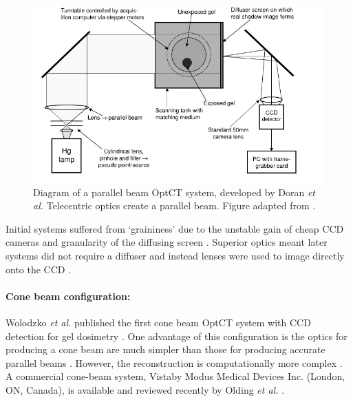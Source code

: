 \documentclass[12pt]{article}
\begin{document}
\begin{figure}[H]
\centering
\includegraphics[scale=0.55]{Doran_2001_ccdsetup.jpg}
\caption{Diagram of a parallel beam  OptCT system, developed by Doran \textit{et al.} Telecentric optics create a parallel beam.  Figure adapted from \cite{Doran:2001ee}. }
\label{fig:doran_ccd_setup}
\end{figure}



Initial systems  suffered from `graininess' due to the unstable gain of cheap CCD cameras and granularity of the diffusing screen \cite{Doran:2001ee}. Superior optics meant later systems did not require a diffuser and instead lenses were used to image directly onto the CCD \cite{Krstajic:2006kna}.  







\paragraph{Cone beam configuration:}
Wolodzko \textit{et al.} published the first cone beam OptCT system with CCD detection for gel dosimetry \cite{Wolodzko:1999}. One advantage of this configuration is the optics for producing a cone beam are much simpler than those for producing accurate parallel beams \cite{Doran:2008kh}. However, the reconstruction is computationally more complex \cite{hsieh2003computed}. A commercial cone-beam system, Vista\texttrademark by Modus Medical Devices Inc. (London, ON, Canada),  is available and reviewed recently by Olding \textit{et al.} \cite{Olding:2011eta}.
\end{document}
